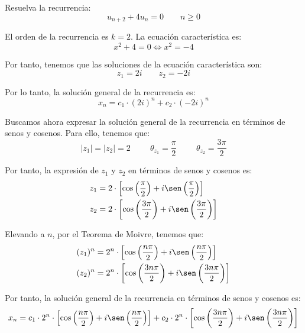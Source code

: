 \begin{ejercicio}
    Resuelva la recurrencia:
    \begin{equation*}
        u_{n+2} + 4u_n = 0 \qquad n\geq 0
    \end{equation*}

    El orden de la recurrencia es $k=2$. La ecuación característica es:
    \begin{equation*}
        x^2 + 4 = 0 \Longleftrightarrow x^2 = -4
    \end{equation*}

    Por tanto, tenemos que las soluciones de la ecuación característica son:
    \begin{equation*}
        z_1 = 2i \qquad z_2 = -2i
    \end{equation*}

    Por lo tanto, la solución general de la recurrencia es:
    \begin{equation*}
        x_n = c_1\cdot (2i)^n + c_2\cdot (-2i)^n
    \end{equation*}

    Buscamos ahora expresar la solución general de la recurrencia en términos de senos y cosenos. Para ello, tenemos que:
    \begin{equation*}
        |z_1| = |z_2| = 2 \hspace{1cm} \theta_{z_1} = \frac{\pi}{2} \hspace{1cm} \theta_{z_2} = \frac{3\pi}{2}
    \end{equation*}

    Por tanto, la expresión de $z_1$ y $z_2$ en términos de senos y cosenos es:
    \begin{align*}
        z_1 &= 2\cdot \left[\cos\left(\frac{\pi}{2}\right) + i\sen\left(\frac{\pi}{2}\right)\right]\\
        z_2 &= 2\cdot \left[\cos\left(\frac{3\pi}{2}\right) + i\sen\left(\frac{3\pi}{2}\right)\right]
    \end{align*}

    Elevando a $n$, por el Teorema de Moivre, tenemos que:
    \begin{align*}
        (z_1)^n &= 2^n\cdot \left[\cos\left(\frac{n\pi}{2}\right) + i\sen\left(\frac{n\pi}{2}\right)\right]\\
        (z_2)^n &= 2^n\cdot \left[\cos\left(\frac{3n\pi}{2}\right) + i\sen\left(\frac{3n\pi}{2}\right)\right]
    \end{align*}

    Por tanto, la solución general de la recurrencia en términos de senos y cosenos es:
    \begin{equation*}
        x_n = c_1\cdot 2^n\cdot \left[\cos\left(\frac{n\pi}{2}\right) + i\sen\left(\frac{n\pi}{2}\right)\right] + c_2\cdot 2^n\cdot \left[\cos\left(\frac{3n\pi}{2}\right) + i\sen\left(\frac{3n\pi}{2}\right)\right]
    \end{equation*}
\end{ejercicio}



